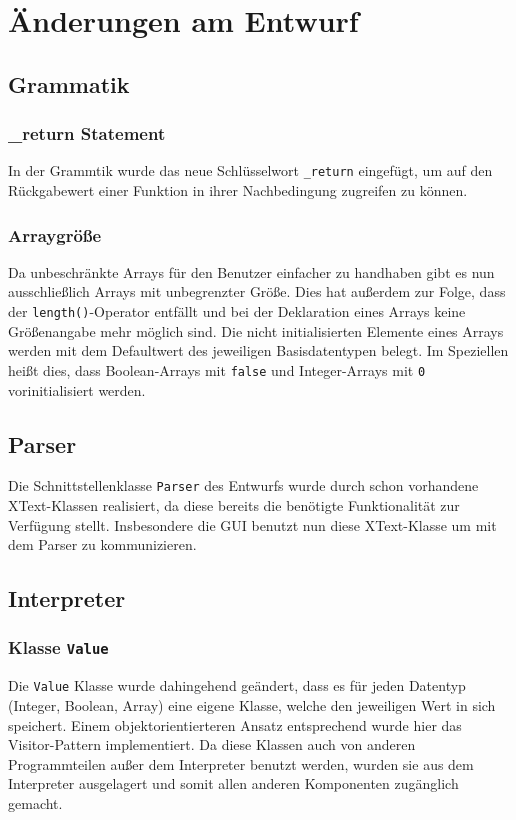 \section{Änderungen am Entwurf}
\subsection{Grammatik}
\subsubsection{\_return Statement}
In der Grammtik wurde das neue Schlüsselwort \texttt{\_return} eingefügt, um auf den Rückgabewert einer Funktion in ihrer Nachbedingung zugreifen zu können.
\subsubsection{Arraygröße}
Da unbeschränkte Arrays für den Benutzer einfacher zu handhaben gibt es nun ausschließlich Arrays mit unbegrenzter Größe. Dies hat außerdem zur Folge, dass der \texttt{length()}-Operator entfällt und bei der Deklaration eines Arrays keine Größenangabe mehr möglich sind. Die nicht initialisierten Elemente eines Arrays werden mit dem Defaultwert des jeweiligen Basisdatentypen belegt. Im Speziellen heißt dies, dass Boolean-Arrays mit \texttt{false} und Integer-Arrays mit \texttt{0} vorinitialisiert werden.

\subsection{Parser}
Die Schnittstellenklasse \texttt{Parser} des Entwurfs wurde durch schon vorhandene XText-Klassen realisiert, da diese bereits die benötigte Funktionalität zur Verfügung stellt. Insbesondere die GUI benutzt nun diese XText-Klasse um mit dem Parser zu kommunizieren.

\subsection{Interpreter}
\subsubsection{Klasse \texttt{Value}}
Die \texttt{Value} Klasse wurde dahingehend geändert, dass es für jeden Datentyp (Integer, Boolean, Array) eine eigene Klasse, welche den jeweiligen Wert in sich speichert. Einem objektorientierteren Ansatz entsprechend wurde hier das Visitor-Pattern implementiert. Da diese Klassen auch von anderen Programmteilen außer dem Interpreter benutzt werden, wurden sie aus dem Interpreter ausgelagert und somit allen anderen Komponenten zugänglich gemacht.

